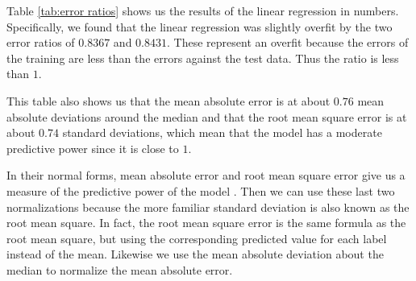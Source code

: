 \documentclass[11pt]{report}
\begin{document}
Table \ref{tab:error ratios} shows us the results of the linear regression in numbers.
Specifically,
we found that the linear regression was slightly overfit by the two error ratios of \(\num{0.8367}\) and \(\num{0.8431}\).
These represent an overfit because the errors of the training are less than the errors against the test data.
Thus the ratio is less than \(1\).

This table also shows us that the mean absolute error is at about \(0.76\) mean absolute deviations around the median
and that the root mean square error is at about \(0.74\) standard deviations,
which mean that the model has a moderate predictive power since it is close to \(1\).

In their normal forms, mean absolute error and root mean square error give us a measure of the predictive power of the model \cite{rms2016}.
Then
we can use these last two normalizations because the more familiar standard deviation is also known as the root mean square.
In fact, the root mean square error is the same formula as the root mean square,
but using the corresponding predicted value for each label instead of the mean.
Likewise we use the mean absolute deviation about the median to normalize the mean absolute error.
\end{document}
